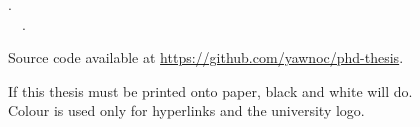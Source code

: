 \vspace*{\fill}

\begin{loosecontent}

\thetitle. \\
\textcopyright~\theyear~\theauthor.

Source code available at \url{https://github.com/yawnoc/phd-thesis}. \\

If this thesis must be printed onto paper, black and white will do. \\
Colour is used only for hyperlinks and the university logo.

\end{loosecontent}

\vspace{5em}
